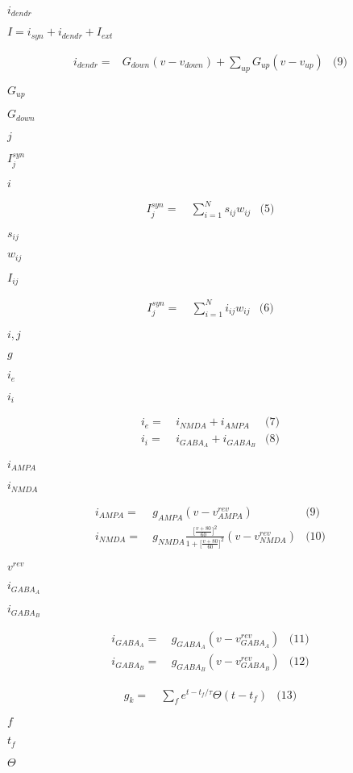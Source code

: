 \documentclass{article}
\begin{document}
$i_{dendr}$
\pagebreak

$I = i_{syn} + i_{dendr} + I_{ext}$
\pagebreak

\begin{align*} i_{dendr} = & G_{down} (v - v_{down}) + \sum \limits_{up} G_{up} (v - v_{up}) & \text{(9)} \end{align*}
\pagebreak

$G_{up}$
\pagebreak

$G_{down}$
\pagebreak

$j$
\pagebreak

$ I_{j}^{syn} $
\pagebreak

$i$
\pagebreak

\begin{align*} I_{j}^{syn} = & ~ \sum \limits_{i=1}^{N} s_{ij}w_{ij} & \text{(5)} \end{align*}
\pagebreak

$s_{ij}$
\pagebreak

$w_{ij}$
\pagebreak

$I_{ij}$
\pagebreak

\begin{align*} I_{j}^{syn} = & ~ \sum \limits_{i=1}^{N} i_{ij}w_{ij} & \text{(6)} \end{align*}
\pagebreak

$i,j$
\pagebreak

$g$
\pagebreak

$i_{e}$
\pagebreak

$i_{i}$
\pagebreak

\begin{align*} i_{e} = & ~ i_{NMDA} + i_{AMPA} & \text{(7)} \\ i_{i} = & ~ i_{GABA_{A}} + i_{GABA_{B}} & \text{(8)} \end{align*}
\pagebreak

$i_{AMPA}$
\pagebreak

$i_{NMDA}$
\pagebreak

\begin{align*} i_{AMPA} = & ~ g_{AMPA}(v-v^{rev}_{AMPA}) & \text{(9)} \\ i_{NMDA} = & ~ g_{NMDA}\frac{\Big[\frac{v+80}{60} \Big]^{2}}{1+\Big[\frac{v+80}{60} \Big]^{2}} (v-v^{rev}_{NMDA}) & \text{(10)} \end{align*}
\pagebreak

$v^{rev}$
\pagebreak

$i_{GABA_A}$
\pagebreak

$i_{GABA_B}$
\pagebreak

\begin{align*} i_{GABA_{A}} = & ~ g_{GABA_{A}}(v-v^{rev}_{GABA_{A}}) & \text{(11)} \\ i_{GABA_{B}} = & ~ g_{GABA_{B}}(v-v^{rev}_{GABA_{B}}) & \text{(12)} \end{align*}
\pagebreak

\begin{align*} g_{k} = & ~ \sum \limits_{f} e^{t-t_{f}/ \tau} \Theta(t-t_f) & \text{(13)} \end{align*}
\pagebreak

$f$
\pagebreak

$t_f$
\pagebreak

$ \Theta $
\pagebreak
\end{document}
